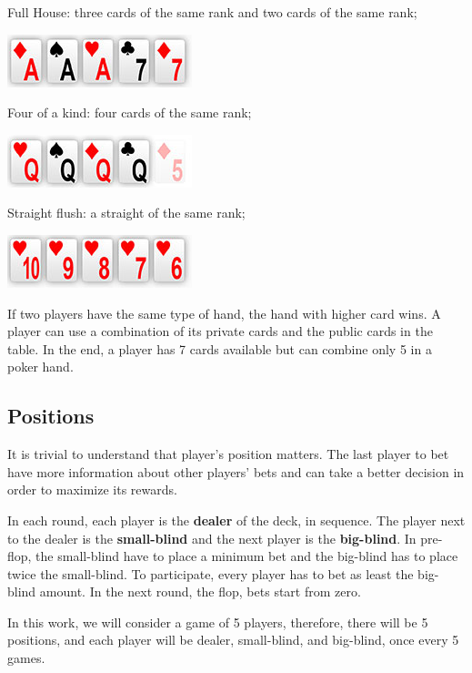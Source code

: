 Full House: three cards of the same rank and two cards of the same rank;
  
\includegraphics[scale=2]{full-house}
  
Four of a kind: four cards of the same rank;
  
\includegraphics[scale=2]{four-of-a-kind}
  
Straight flush: a straight of the same rank;
  
\includegraphics[scale=2]{straight-flush}
 
If two players have the same type of hand, the hand with higher card wins. A player can use a combination of its private cards and the public cards in the table. In the end, a player has 7 cards available but can combine only 5 in a poker hand.

\subsection{Positions}
\label{sec:positions}

It is trivial to understand that player's position matters. The last player to bet have more information about other players' bets and can take a better decision in order to maximize its rewards.

In each round, each player is the \textbf{dealer} of the deck, in sequence. The player next to the dealer is the \textbf{small-blind} and the next player is the \textbf{big-blind}. In pre-flop, the small-blind have to place a minimum bet and the big-blind has to place twice the small-blind. To participate, every player has to bet as least the big-blind amount. In the next round, the flop, bets start from zero.

In this work, we will consider a game of 5 players, therefore, there will be 5 positions, and each player will be dealer, small-blind, and big-blind, once every 5 games.

